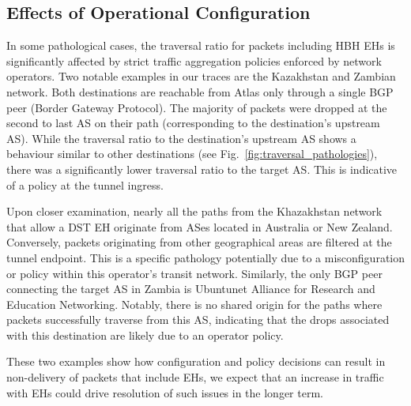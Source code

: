 \documentclass[conference]{IEEEtran}
\begin{document}
\subsection{Effects of Operational Configuration}
    \label{subsec: pathologies}

In some pathological cases, the traversal ratio for packets including HBH EHs is significantly
affected by strict traffic aggregation policies enforced by network operators.
Two notable examples in our traces are the Kazakhstan and Zambian network.
Both destinations are reachable from Atlas only through a single BGP peer
(Border Gateway Protocol). The majority of packets were dropped at the
second to last AS on their path (corresponding to the destination's upstream AS).
While the traversal ratio to the destination's upstream AS shows a behaviour
similar to other destinations (see Fig.~\ref{fig:traversal_pathologies}),
there was a significantly lower traversal ratio to the target AS. This is indicative of a
policy at the tunnel ingress.


Upon closer examination,  nearly all the paths from the
Khazakhstan network that allow a DST EH originate from ASes
located in Australia or New Zealand. Conversely, packets originating from other
geographical areas are filtered at the tunnel endpoint. This is a specific
pathology potentially due to a misconfiguration or policy within this operator's
transit network.
Similarly, the only BGP peer connecting the target AS in Zambia is Ubuntunet
Alliance for Research and Education Networking.  Notably, there is no shared
origin for the paths where packets successfully traverse from this AS,
indicating that the drops associated with this destination are likely
due to an operator policy. 

These two examples show how configuration and policy 
decisions can result in non-delivery of packets that include EHs, we expect 
that an increase in traffic with EHs could drive resolution of such issues in the longer term.
\end{document}
